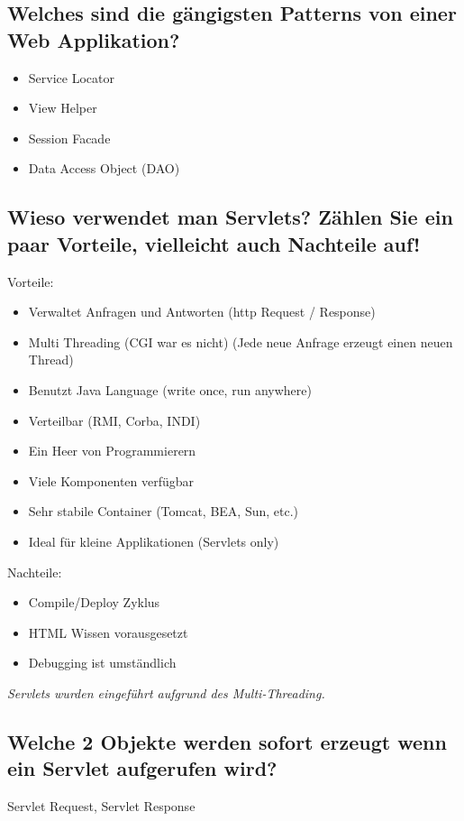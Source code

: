 \subsection{Welches sind die gängigsten Patterns von einer Web Applikation?}
\begin{itemize}
	\item Service Locator
	\item View Helper
	\item Session Facade
	\item Data Access Object (DAO)
\end{itemize}

\subsection{Wieso verwendet man Servlets? Zählen Sie ein paar Vorteile, vielleicht auch Nachteile auf!}
Vorteile:
\begin{itemize}
\item Verwaltet Anfragen und Antworten (http Request / Response)
\item Multi Threading (CGI war es nicht) (Jede neue Anfrage erzeugt einen neuen Thread)
\item Benutzt Java Language (write once, run anywhere)
\item Verteilbar (RMI, Corba, INDI)
\item Ein Heer von Programmierern
\item Viele Komponenten verfügbar
\item Sehr stabile Container (Tomcat, BEA, Sun, etc.)
\item Ideal für kleine Applikationen (Servlets only)
\end{itemize}

Nachteile:
\begin{itemize}
\item Compile/Deploy Zyklus
\item HTML Wissen vorausgesetzt
\item Debugging ist umständlich
\end{itemize}

\emph{Servlets wurden eingeführt aufgrund des Multi-Threading.}

\subsection{Welche 2 Objekte werden sofort erzeugt wenn ein Servlet aufgerufen wird?}
Servlet Request, Servlet Response

